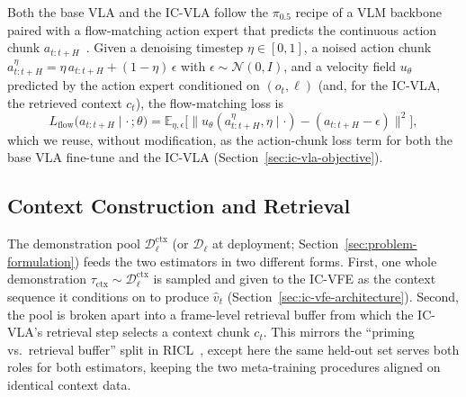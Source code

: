 Both the base VLA and the IC-VLA follow the $\pi_{0.5}$ recipe of a VLM backbone
paired with a flow-matching action expert
that predicts the continuous action chunk $a_{t:t+H}$~\cite{pi05}. Given a denoising
timestep $\eta \in [0,1]$, a noised action chunk $a_{t:t+H}^\eta = \eta\, a_{t:t+H} +
(1-\eta)\,\epsilon$ with $\epsilon \sim \mathcal{N}(0, I)$, and a velocity field
$u_\theta$ predicted by the action expert conditioned on $(o_t, \ell)$ (and, for the
IC-VLA, the retrieved context $c_t$), the flow-matching loss is
\begin{equation}
    L_{\text{flow}}\big(a_{t:t+H} \mid \cdot\,; \theta\big)
    = \mathbb{E}_{\eta, \epsilon}\Big[\big\|u_\theta(a_{t:t+H}^\eta, \eta \mid \cdot) -
    (a_{t:t+H} - \epsilon)\big\|^2\Big] ,
    \label{eq:flow-loss}
\end{equation}
which we reuse, without modification, as the action-chunk loss term for both the base
VLA fine-tune and the IC-VLA (Section~\ref{sec:ic-vla-objective}).

\subsection{Context Construction and Retrieval}
\label{sec:context-retrieval}

The demonstration pool $\mathcal{D}_\ell^{\text{ctx}}$ (or $\mathcal{D}_\ell$ at
deployment; Section~\ref{sec:problem-formulation}) feeds the two estimators in two
different forms. First, one whole demonstration $\tau_{\text{ctx}} \sim
\mathcal{D}_\ell^{\text{ctx}}$ is sampled and given to the IC-VFE as the context
sequence it conditions on to produce $\hat v_t$ (Section~\ref{sec:ic-vfe-architecture}).
Second, the pool is broken apart into a frame-level retrieval buffer from which the
IC-VLA's retrieval step selects a context chunk $c_t$. This mirrors the ``priming
vs.\ retrieval buffer'' split in RICL~\cite{ricl}, except here the same held-out set
serves both roles for both estimators, keeping the two meta-training procedures
aligned on identical context data.

